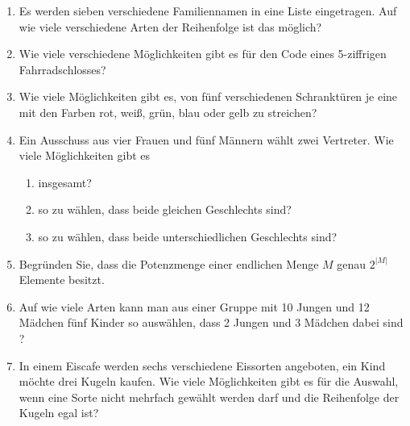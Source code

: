 \documentclass[12pt,a4paper]{scrreprt}
\begin{document}
\begin{enumerate}
\begin{enumerate}
			\end{enumerate}
\item Es werden sieben verschiedene Familiennamen in eine Liste eingetragen. Auf wie viele
verschiedene Arten der Reihenfolge ist das möglich?
\item Wie viele verschiedene Möglichkeiten gibt es für den Code eines 5-ziffrigen Fahrradschlosses?
\item Wie viele Möglichkeiten gibt es, von fünf verschiedenen Schranktüren je eine mit den
Farben rot, weiß, grün, blau oder gelb zu streichen?
\item Ein Ausschuss aus vier Frauen und fünf Männern wählt zwei Vertreter. Wie viele
Möglichkeiten gibt es
 \begin{enumerate}
				\item insgesamt?
				\item so zu wählen, dass beide gleichen Geschlechts sind?
				\item so zu wählen, dass beide unterschiedlichen Geschlechts sind?
 \end{enumerate}
\item Begründen Sie, dass die Potenzmenge einer endlichen Menge $M$ genau $2^{|M|}$ Elemente besitzt.
\item Auf wie viele Arten kann man aus einer Gruppe mit 10 Jungen und 12 Mädchen
fünf Kinder so auswählen, dass 2 Jungen und 3 Mädchen dabei sind ?
\item In einem Eiscafe werden sechs verschiedene Eissorten angeboten, ein Kind möchte drei
Kugeln kaufen. Wie viele Möglichkeiten gibt es für die Auswahl, wenn eine Sorte
nicht mehrfach gewählt werden darf und die Reihenfolge der Kugeln egal ist?
 \end{enumerate}
\end{document}
